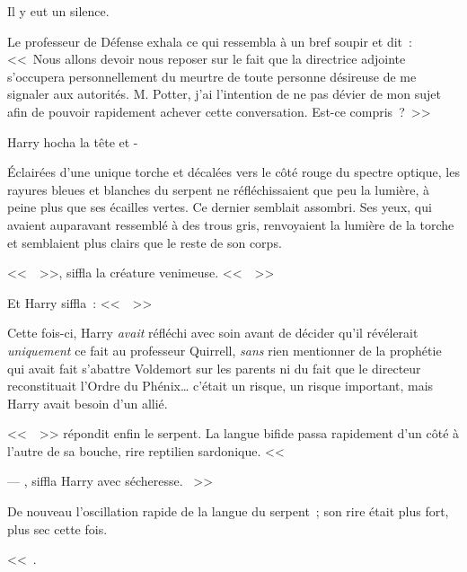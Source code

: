 Il y eut un silence.

Le professeur de Défense exhala ce qui ressembla à un bref soupir et dit~: <<~Nous allons devoir nous reposer sur le fait que la directrice adjointe s'occupera personnellement du meurtre de toute personne désireuse de me signaler aux autorités. M. Potter, j'ai l'intention de ne pas dévier de mon sujet afin de pouvoir rapidement achever cette conversation. Est-ce compris~?~>>

Harry hocha la tête et -

Éclairées d'une unique torche et décalées vers le côté rouge du spectre optique, les rayures bleues et blanches du serpent ne réfléchissaient que peu la lumière, à peine plus que ses écailles vertes. Ce dernier semblait assombri. Ses yeux, qui avaient auparavant ressemblé à des trous gris, renvoyaient la lumière de la torche et semblaient plus clairs que le reste de son corps.

<<~~>>, siffla la créature venimeuse. <<~~>>

Et Harry siffla~: <<~~>>

Cette fois-ci, Harry \emph{avait} réfléchi avec soin avant de décider qu'il révélerait \emph{uniquement} ce fait au professeur Quirrell, \emph{sans} rien mentionner de la prophétie qui avait fait s'abattre Voldemort sur les parents ni du fait que le directeur reconstituait l'Ordre du Phénix… c'était un risque, un risque important, mais Harry avait besoin d'un allié.

<<~~>> répondit enfin le serpent. La langue bifide passa rapidement d'un côté à l'autre de sa bouche, rire reptilien sardonique. <<~

--- , siffla Harry avec sécheresse. ~>>

De nouveau l'oscillation rapide de la langue du serpent~; son rire était plus fort, plus sec cette fois.

<<~.

